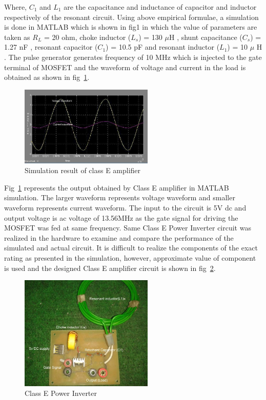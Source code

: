 \documentclass[journal,twoside]{IEEEtran}
\begin{document}
Where, $C_1$ and $L_1$ are the capacitance and inductance of
capacitor and inductor respectively of the resonant circuit.
Using above empirical formulae, a simulation is done in
MATLAB which is shown in fig1 in which the value of
parameters are taken as $R_L$ = 20 ohm, choke inductor ($L_s$) =
130 $\mu$H , shunt capacitance ($C_s$) = 1.27 nF , resonant
capacitor ($C_1$) = 10.5 pF and resonant inductor ($L_1$) = 10 $\mu$ H .
The pulse generator generates frequency of 10 MHz which is
injected to the gate terminal of MOSFET and the waveform
of voltage and current in the load is obtained as shown in fig~\ref{fig_4}.
\begin{figure}[!ht]
\centering
\includegraphics[width=2.5in]{4}
\caption{Simulation result of class E amplifier}
\label{fig_4}
\end{figure}
Fig~\ref{fig_4} represents the output obtained by Class E amplifier in
MATLAB simulation. The larger waveform represents
voltage waveform and smaller waveform represents current
waveform. The input to the circuit is 5V dc and output voltage is ac voltage of 13.56MHz as the gate signal for
driving the MOSFET was fed at same frequency.
Same Class E Power Inverter circuit was realized in the
hardware to examine and compare the performance of the
simulated and actual circuit. It is difficult to realize the
components of the exact rating as presented in the simulation,
however, approximate value of component is used and the
designed Class E amplifier circuit is shown in fig~\ref{fig_5}.
\begin{figure}[!ht]
\centering
\includegraphics[width=2.5in]{5}
\caption{Class E Power Inverter}
\label{fig_5}
\end{figure}
\end{document}
